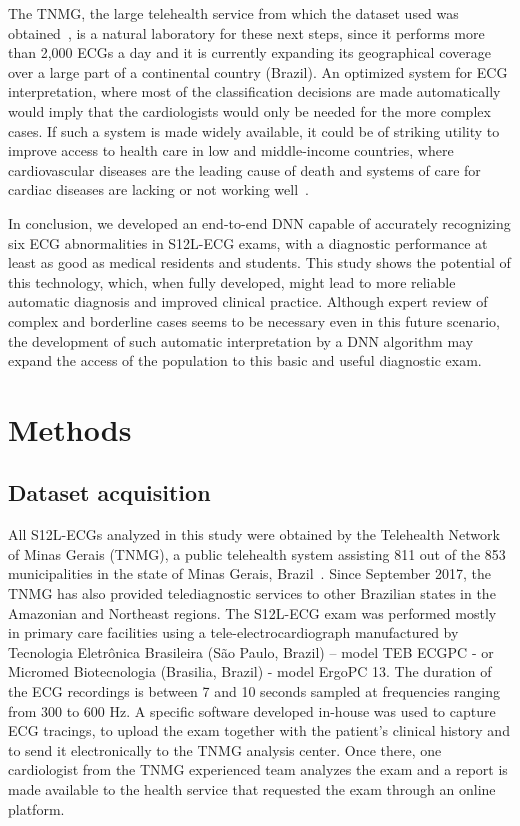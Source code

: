 \documentclass{article}
\begin{document}
The TNMG, the large telehealth service from which the dataset used was obtained~\cite{alkmim_improving_2012}, is a natural laboratory for these next steps, since it performs more than 2,000 ECGs a day and it is currently expanding its geographical coverage over a large part of a continental country (Brazil). An optimized system for ECG interpretation, where most of  the classification decisions are made automatically would imply that the cardiologists would only be needed for the more complex cases. If such a system is made widely available, it could be of striking utility to improve access to health care in low and middle-income countries, where cardiovascular diseases are the leading cause of death and systems of care for cardiac diseases are lacking or not working well~\cite{nascimento_implementing_2019}.
 

In conclusion, we developed an end-to-end DNN capable of accurately recognizing six ECG abnormalities in S12L-ECG exams, with a diagnostic performance at least as good as medical residents and students. This study shows the potential of this technology, which, when fully developed, might lead to more reliable automatic diagnosis and improved clinical practice. Although expert review of complex and borderline cases seems to be necessary even in this future scenario, the development of such automatic interpretation by a DNN algorithm may expand the access of the population to this basic and useful diagnostic exam. 



\section{Methods}

\subsection{Dataset acquisition}
All S12L-ECGs analyzed in this study were obtained by the Telehealth Network of Minas Gerais (TNMG), a public telehealth system assisting 811 out of the 853 municipalities in the state of Minas Gerais,  Brazil~\cite{alkmim_improving_2012}. Since September 2017, the TNMG has also provided telediagnostic services to other Brazilian states in the Amazonian and Northeast regions. The S12L-ECG exam was performed mostly in primary care facilities  using a tele-electrocardiograph manufactured by Tecnologia Eletrônica Brasileira (São Paulo, Brazil) – model TEB ECGPC - or Micromed Biotecnologia (Brasilia, Brazil) - model ErgoPC 13. The duration of the ECG recordings is between 7 and 10 seconds sampled at frequencies ranging from 300 to 600 Hz. A specific software developed in-house was used to capture ECG tracings, to upload the exam together with the patient’s clinical history and to send it electronically to the TNMG analysis center. Once there, one cardiologist from the TNMG experienced team analyzes the exam and a report is made available to the health service that requested the exam through an online platform.
\end{document}
